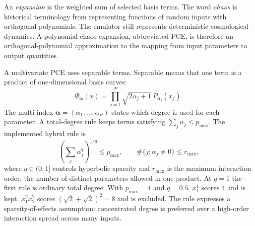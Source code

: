 \documentclass[10pt,aps,prd,twocolumn,nofootinbib]{revtex4-2}
\begin{document}
An \emph{expansion} is the weighted sum of selected basis terms.  The word
\emph{chaos} is historical terminology from representing functions of random
inputs with orthogonal polynomials.  The emulator still represents
deterministic cosmological dynamics.  A polynomial chaos expansion, abbreviated
PCE, is therefore an orthogonal-polynomial approximation to the mapping from
input parameters to output quantities.

A multivariate PCE uses separable terms.  Separable means that one term is a
product of one-dimensional basis curves:
\begin{equation}
  \Psi_{\boldsymbol\alpha}(x)
  =\prod_{j=1}^{P}
  \sqrt{2\alpha_j+1}\,P_{\alpha_j}(x_j).
  \label{eq:pce-term}
\end{equation}
The multi-index $\boldsymbol\alpha=(\alpha_1,\ldots,\alpha_P)$ states which
degree is used for each parameter.  A total-degree rule keeps terms satisfying
$\sum_j\alpha_j\le p_{\max}$.  The implemented hybrid rule is
\begin{equation*}
 \left(\sum_j\alpha_j^q\right)^{1/q}\le p_{\max},
 \qquad
 \#\{j:\alpha_j\ne0\}\le r_{\max},
\end{equation*}
where $q\in(0,1]$ controls hyperbolic sparsity and $r_{\max}$ is the maximum
interaction order, the number of distinct parameters allowed in one
product.  At $q=1$ the first rule is ordinary total degree.  With
$p_{\max}=4$ and $q=0.5$, $x_1^4$ scores $4$ and is kept.
$x_1^2x_2^2$ scores $(\sqrt2+\sqrt2)^2=8$ and is excluded.  The rule expresses
a sparsity-of-effects assumption: concentrated degree is preferred over a
high-order interaction spread across many inputs.
\end{document}
